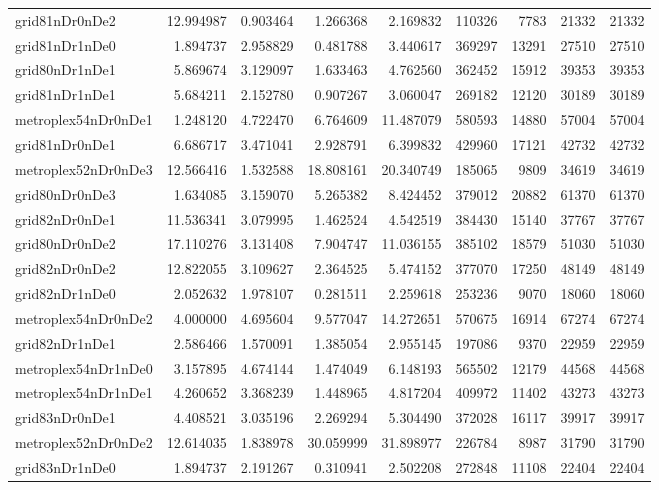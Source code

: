 \begin{longtable}{|l|r|r|r|r|r|r|r|r|}
grid81nDr0nDe2 & 12.994987 & 0.903464 & 1.266368 & 2.169832 & 110326 & 7783 & 21332 & 21332 \\
grid81nDr1nDe0 & 1.894737 & 2.958829 & 0.481788 & 3.440617 & 369297 & 13291 & 27510 & 27510 \\
grid80nDr1nDe1 & 5.869674 & 3.129097 & 1.633463 & 4.762560 & 362452 & 15912 & 39353 & 39353 \\
grid81nDr1nDe1 & 5.684211 & 2.152780 & 0.907267 & 3.060047 & 269182 & 12120 & 30189 & 30189 \\
metroplex54nDr0nDe1 & 1.248120 & 4.722470 & 6.764609 & 11.487079 & 580593 & 14880 & 57004 & 57004 \\
grid81nDr0nDe1 & 6.686717 & 3.471041 & 2.928791 & 6.399832 & 429960 & 17121 & 42732 & 42732 \\
metroplex52nDr0nDe3 & 12.566416 & 1.532588 & 18.808161 & 20.340749 & 185065 & 9809 & 34619 & 34619 \\
grid80nDr0nDe3 & 1.634085 & 3.159070 & 5.265382 & 8.424452 & 379012 & 20882 & 61370 & 61370 \\
grid82nDr0nDe1 & 11.536341 & 3.079995 & 1.462524 & 4.542519 & 384430 & 15140 & 37767 & 37767 \\
grid80nDr0nDe2 & 17.110276 & 3.131408 & 7.904747 & 11.036155 & 385102 & 18579 & 51030 & 51030 \\
grid82nDr0nDe2 & 12.822055 & 3.109627 & 2.364525 & 5.474152 & 377070 & 17250 & 48149 & 48149 \\
grid82nDr1nDe0 & 2.052632 & 1.978107 & 0.281511 & 2.259618 & 253236 & 9070 & 18060 & 18060 \\
metroplex54nDr0nDe2 & 4.000000 & 4.695604 & 9.577047 & 14.272651 & 570675 & 16914 & 67274 & 67274 \\
grid82nDr1nDe1 & 2.586466 & 1.570091 & 1.385054 & 2.955145 & 197086 & 9370 & 22959 & 22959 \\
metroplex54nDr1nDe0 & 3.157895 & 4.674144 & 1.474049 & 6.148193 & 565502 & 12179 & 44568 & 44568 \\
metroplex54nDr1nDe1 & 4.260652 & 3.368239 & 1.448965 & 4.817204 & 409972 & 11402 & 43273 & 43273 \\
grid83nDr0nDe1 & 4.408521 & 3.035196 & 2.269294 & 5.304490 & 372028 & 16117 & 39917 & 39917 \\
metroplex52nDr0nDe2 & 12.614035 & 1.838978 & 30.059999 & 31.898977 & 226784 & 8987 & 31790 & 31790 \\
grid83nDr1nDe0 & 1.894737 & 2.191267 & 0.310941 & 2.502208 & 272848 & 11108 & 22404 & 22404 \\

\end{longtable}
